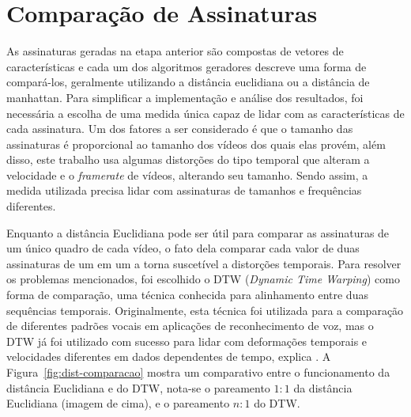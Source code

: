 
\section{Comparação de Assinaturas}
\label{sec:met-comparacao}

As assinaturas geradas na etapa anterior são compostas de vetores de características e cada um dos algoritmos geradores descreve uma forma de compará-los, geralmente utilizando a distância euclidiana ou a distância de manhattan. Para simplificar a implementação e análise dos resultados, foi necessária a escolha de uma medida única capaz de lidar com as características de cada assinatura. Um dos fatores a ser considerado é que o tamanho das assinaturas é proporcional ao tamanho dos vídeos dos quais elas provém, além disso, este trabalho usa algumas distorções do tipo temporal que alteram a velocidade e o \textit{framerate} de vídeos, alterando seu tamanho. Sendo assim, a medida utilizada precisa lidar com assinaturas de tamanhos e frequências diferentes.

Enquanto a distância Euclidiana pode ser útil para comparar as assinaturas de um único quadro de cada vídeo, o fato dela comparar cada valor de duas assinaturas de um em um a torna suscetível a distorções temporais. Para resolver os problemas mencionados, foi escolhido o DTW (\textit{Dynamic Time Warping}) como forma de comparação, uma técnica conhecida para alinhamento entre duas sequências temporais. Originalmente, esta técnica foi utilizada para a comparação de diferentes padrões vocais em aplicações de reconhecimento de voz, mas o DTW já foi utilizado com sucesso para lidar com deformações temporais e velocidades diferentes em dados dependentes de tempo, explica \citeauthor{muller2007dynamic}. A Figura~\ref{fig:dist-comparacao} mostra um comparativo entre o funcionamento da distância Euclidiana e do DTW, nota-se o pareamento $1:1$ da distância Euclidiana (imagem de cima), e o pareamento $n:1$ do DTW.

